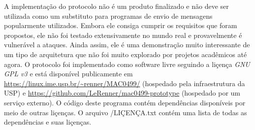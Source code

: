 A implementação do protocolo não é um produto finalizado e não deve ser utilizada como um substituto para programas de envio de mensagens popularmente utilizados. Embora ele consiga cumprir os requisitos que foram propostos, ele não foi testado extensivamente no mundo real e provavelmente é vulnerável a ataques. Ainda assim, ele é uma demonstração muito interessante de um tipo de arquitetura que não foi muito explorado por projetos acadêmicos até agora. O protocolo foi implementado como software livre seguindo a liçença \textit{GNU GPL v3} e está disponível publicamente em \url{https://linux.ime.usp.br/~renner/MAC0499/} (hospedado pela infraestrutura da USP) e \url{https://github.com/LeRenner/mac0499-prototype} (hospedado por um serviço externo). O código deste programa contém dependências disponíveis por meio de outras liçenças. O arquivo /LIÇENÇA.txt contém uma lista de todas as dependências e suas liçenças.